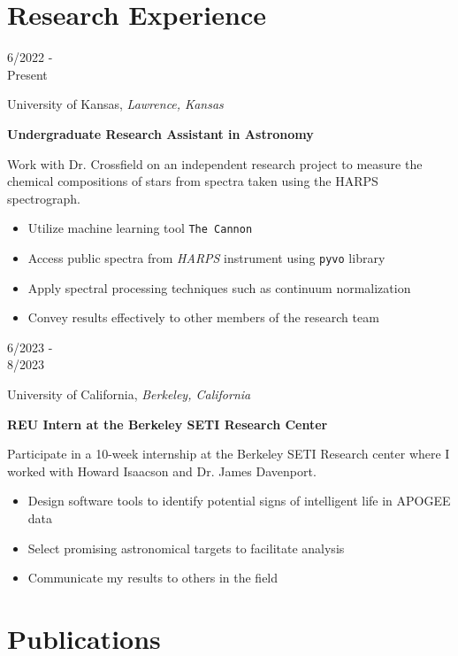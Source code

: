 \documentclass[12pt]{article}
\newenvironment{entry}[4]{
  \medskip
  \begin{minipage}[t]{0.75in}
    #3
  \end{minipage}
  \begin{minipage}[t]{\dimexpr\textwidth-0.75in}
    #1, \textit{#2}

    \textbf{#4}
    
    \smallskip
}{
  \end{minipage}
}
\begin{document}
\section*{Research Experience}\vspace{-1ex}

\begin{entry}{University of Kansas}{Lawrence, Kansas}{6/2022 -\\ Present}{Undergraduate Research Assistant in Astronomy}
  Work with Dr. Crossfield on an independent research project to measure the
  chemical compositions of stars from spectra taken using the HARPS
  spectrograph.
  \begin{itemize}
    \item Utilize machine learning tool \texttt{The Cannon}
    \item Access public spectra from \textit{HARPS} instrument using
      \texttt{pyvo} library
    \item Apply spectral processing techniques such as continuum normalization
    \item Convey results effectively to other members of the research team
  \end{itemize}
\end{entry}

\begin{entry}{University of California}{Berkeley, California}{6/2023 -\\ 8/2023}{REU Intern at the Berkeley SETI Research Center}
  Participate in a 10-week internship at the Berkeley SETI Research center where I worked with Howard Isaacson and Dr. James Davenport.
  \begin{itemize}
    \item Design software tools to identify potential signs of intelligent
      life in APOGEE data
    \item Select promising astronomical targets to facilitate analysis
    \item Communicate my results to others in the field
  \end{itemize}
\end{entry}

\section*{Publications}\vspace{-1ex}

\newcommand{\publication}[6]{
  \medskip
  \begin{minipage}[t]{0.75in}
    #3
  \end{minipage}
  \begin{minipage}[t]{\dimexpr\textwidth-0.75in}
    \textbf{#4},#5\\
    #1, \href{#6}{\textit{#2}}
  \end{minipage}  

}
\end{document}
